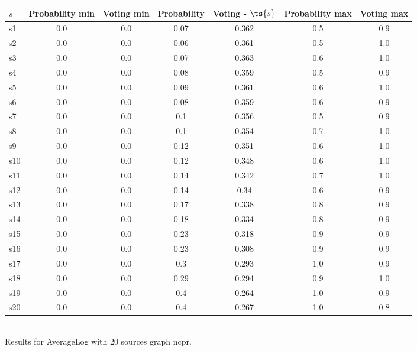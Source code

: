 \documentclass{article}
\begin{document}
\noindent\begin{tabular}{|l|c|c|c|c|c|c|}
\hline
$s$& Probability min & Voting min & Probability & Voting - $\ts{s}$ & Probability max & Voting max\\
\hline
s1 &0.0 & 0.0 & 0.07 & 0.362 & 0.5 & 0.9\\
\hline
s2 &0.0 & 0.0 & 0.06 & 0.361 & 0.5 & 1.0\\
\hline
s3 &0.0 & 0.0 & 0.07 & 0.363 & 0.6 & 1.0\\
\hline
s4 &0.0 & 0.0 & 0.08 & 0.359 & 0.5 & 0.9\\
\hline
s5 &0.0 & 0.0 & 0.09 & 0.361 & 0.6 & 1.0\\
\hline
s6 &0.0 & 0.0 & 0.08 & 0.359 & 0.6 & 0.9\\
\hline
s7 &0.0 & 0.0 & 0.1 & 0.356 & 0.5 & 0.9\\
\hline
s8 &0.0 & 0.0 & 0.1 & 0.354 & 0.7 & 1.0\\
\hline
s9 &0.0 & 0.0 & 0.12 & 0.351 & 0.6 & 1.0\\
\hline
s10 &0.0 & 0.0 & 0.12 & 0.348 & 0.6 & 1.0\\
\hline
s11 &0.0 & 0.0 & 0.14 & 0.342 & 0.7 & 1.0\\
\hline
s12 &0.0 & 0.0 & 0.14 & 0.34 & 0.6 & 0.9\\
\hline
s13 &0.0 & 0.0 & 0.17 & 0.338 & 0.8 & 0.9\\
\hline
s14 &0.0 & 0.0 & 0.18 & 0.334 & 0.8 & 0.9\\
\hline
s15 &0.0 & 0.0 & 0.23 & 0.318 & 0.9 & 0.9\\
\hline
s16 &0.0 & 0.0 & 0.23 & 0.308 & 0.9 & 0.9\\
\hline
s17 &0.0 & 0.0 & 0.3 & 0.293 & 1.0 & 0.9\\
\hline
s18 &0.0 & 0.0 & 0.29 & 0.294 & 0.9 & 1.0\\
\hline
s19 &0.0 & 0.0 & 0.4 & 0.264 & 1.0 & 0.9\\
\hline
s20 &0.0 & 0.0 & 0.4 & 0.267 & 1.0 & 0.8\\
\hline
\end{tabular}\\

\noindent Results for AverageLog with 20 sources graph ncpr.
\end{document}

